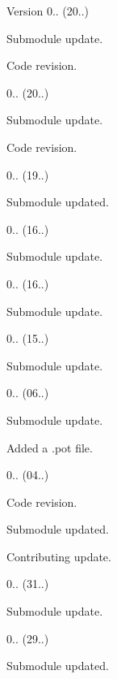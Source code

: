 \begin{DoxyVersion}{Version}
0.. (20..)
\begin{DoxyItemize}
\item Submodule update.
\item Code revision. 
\end{DoxyItemize}

0.. (20..)
\begin{DoxyItemize}
\item Submodule update.
\item Code revision. 
\end{DoxyItemize}

0.. (19..)
\begin{DoxyItemize}
\item Submodule updated. 
\end{DoxyItemize}

0.. (16..)
\begin{DoxyItemize}
\item Submodule update. 
\end{DoxyItemize}

0.. (16..)
\begin{DoxyItemize}
\item Submodule update. 
\end{DoxyItemize}

0.. (15..)
\begin{DoxyItemize}
\item Submodule update. 
\end{DoxyItemize}

0.. (06..)
\begin{DoxyItemize}
\item Submodule update.
\item Added a .pot file. 
\end{DoxyItemize}

0.. (04..)
\begin{DoxyItemize}
\item Code revision.
\item Submodule updated.
\item Contributing update. 
\end{DoxyItemize}

0.. (31..)
\begin{DoxyItemize}
\item Submodule update. 
\end{DoxyItemize}

0.. (29..)
\begin{DoxyItemize}
\item Submodule updated. 
\end{DoxyItemize}


\end{DoxyVersion}
